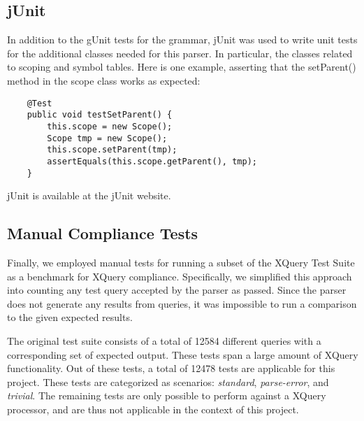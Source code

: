 \subsection{jUnit}
In addition to the gUnit tests for the grammar, jUnit was used to write unit tests for
the additional classes needed for this parser. In particular, the classes
related to scoping and symbol tables. Here is one example, asserting that the
setParent() method in the scope class works as expected:
\begin{Verbatim}
    @Test
    public void testSetParent() {
        this.scope = new Scope();
        Scope tmp = new Scope();
        this.scope.setParent(tmp);
        assertEquals(this.scope.getParent(), tmp);
    }
\end{Verbatim}

jUnit is available at the jUnit website\cite{junit_website}.

\subsection{Manual Compliance Tests}
Finally, we employed manual tests for running a subset of the XQuery Test
Suite\cite{w3c05} as a benchmark for XQuery compliance. Specifically, we
simplified this approach into counting any test query accepted by the parser as
passed. Since the parser does not generate any results from queries, it was
impossible to run a comparison to the given expected results.

The original test suite consists of a total of 12584 different queries with a
corresponding set of expected output. These tests span a large amount of XQuery
functionality. Out of these tests, a total of 12478 tests are applicable for
this project. These tests are categorized as scenarios: \emph{standard}, 
\emph{parse-error}, and \emph{trivial}. The remaining tests are only possible to
perform against a XQuery processor, and are thus not applicable in the context of this project.